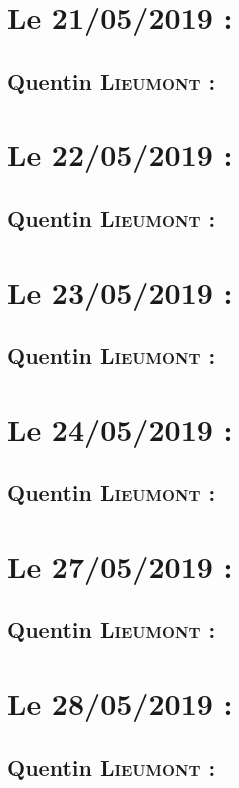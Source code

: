 \section{Le 21/05/2019 :}
    \subsection{Quentin \textsc{Lieumont} :}
        
\newpage
\section{Le 22/05/2019 :}
    \subsection{Quentin \textsc{Lieumont} :}
        
\newpage
\section{Le 23/05/2019 :}
    \subsection{Quentin \textsc{Lieumont} :}
        
\newpage
\section{Le 24/05/2019 :}
    \subsection{Quentin \textsc{Lieumont} :}
        
\newpage
\section{Le 27/05/2019 :}
    \subsection{Quentin \textsc{Lieumont} :}
        
\newpage
\section{Le 28/05/2019 :}
    \subsection{Quentin \textsc{Lieumont} :}
        
